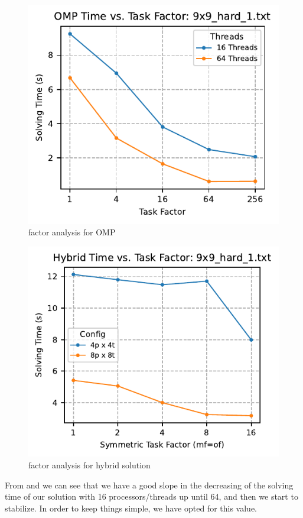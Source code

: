 \begin{figure}[htbp]
\centering
\includegraphics[width=0.9\linewidth]{imgs/factor_analysis_omp_9x9_hard_1.pdf}
\caption{factor analysis for OMP}
\label{fig:factor_analysis_omp}
\end{figure}

\begin{figure}[htbp]
\centering
\includegraphics[width=0.9\linewidth]{imgs/factor_analysis_hybrid_9x9_hard_1.pdf}
\caption{factor analysis for hybrid solution}
\label{fig:factor_analysis_hybrid}
\end{figure}

From  and  we can see that we have a good slope in the decreasing of the solving time of our solution with 16 processors/threads up until 64, and then we start to stabilize. In order to keep things simple, we have opted for this value.

